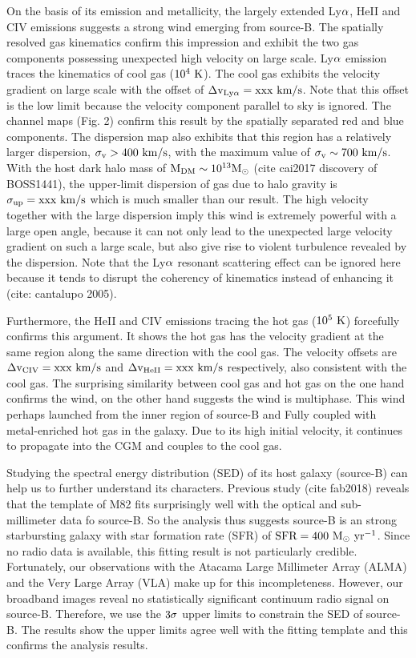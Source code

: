\documentclass{nature}
\begin{document}
On the basis of its emission and metallicity, the largely extended Ly$\rm \alpha$, HeII and CIV emissions suggests a strong wind emerging from source-B. The spatially resolved gas kinematics confirm this impression and exhibit the two gas components possessing unexpected high velocity on large scale. Ly$\rm \alpha$ emission traces the kinematics of cool gas ($\rm 10^{4} \ K$). The cool gas exhibits the velocity gradient on large scale with the offset of $\rm \Delta v_{Ly\alpha}=xxx \ km/s$. Note that this offset is the low limit because the velocity component parallel to sky is ignored. The channel maps (Fig. 2) confirm this result by the spatially separated red and blue components. The dispersion map also exhibits that this region has a relatively larger dispersion, $\rm \sigma_{v}>400 \ km/s$, with the maximum value of $\rm \sigma_{v}\sim 700 \ km/s$. With the host dark halo mass of $\rm M_{DM}\sim 10^{13}M_{\odot}$ (cite cai2017 discovery of BOSS1441), the upper-limit dispersion of gas due to halo gravity is $\rm \sigma_{up}=xxx \ km/s$ which is much smaller than our result. The high velocity together with the large dispersion imply this wind is extremely powerful with a large open angle, because it can not only lead to the unexpected large velocity gradient on such a large scale, but also give rise to violent turbulence revealed by the dispersion. Note that the Ly$\rm \alpha$ resonant scattering effect can be ignored here because it tends to disrupt the coherency of kinematics instead of enhancing it (cite: cantalupo 2005). 

Furthermore, the HeII and CIV emissions tracing the hot gas ($\rm 10^{5} \ K$) forcefully confirms this argument. It shows the hot gas has the velocity gradient at the same region along the same direction with the cool gas. The velocity offsets are $\rm \Delta v_{CIV}=xxx \ km/s$ and $\rm \Delta v_{HeII}=xxx \ km/s$ respectively, also consistent with the cool gas. The surprising similarity between cool gas and hot gas on the one hand confirms the wind, on the other hand suggests the wind is multiphase. This wind perhaps launched from the inner region of source-B and Fully coupled with metal-enriched hot gas in the galaxy. Due to its high initial velocity, it continues to propagate into the CGM and couples to the cool gas. 

 Studying the spectral energy distribution (SED) of its host galaxy (source-B) can help us to further understand its characters. Previous study (cite fab2018) reveals that the template of M82 fits surprisingly well with the optical and sub-millimeter data fo source-B. So the analysis thus suggests source-B is an strong starbursting galaxy with star formation rate (SFR) of $\rm SFR=400 \ M_{\odot} \ yr^{-1}$. Since no radio data is available, this fitting result is not particularly credible. Fortunately, our observations with the Atacama Large Millimeter Array (ALMA) and the Very Large Array (VLA) make up for this incompleteness. However, our broadband images reveal no statistically significant continuum radio signal on source-B. Therefore, we use the $\rm 3\sigma$ upper limits to constrain the SED of source-B. The results show the upper limits agree well with the fitting template and this confirms the  analysis results. 
\end{document}
